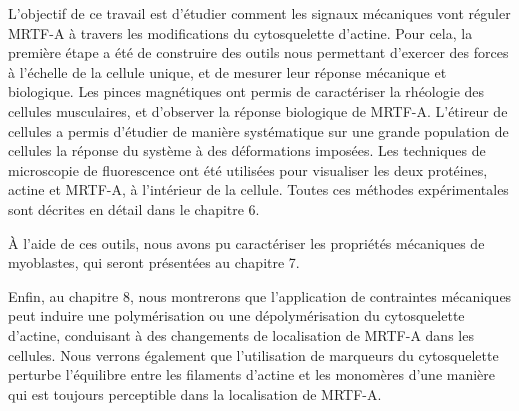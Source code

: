   L'objectif de ce travail est d'étudier comment les signaux mécaniques vont réguler MRTF-A à travers les modifications du cytosquelette d'actine. Pour cela, la première étape a été de construire des outils nous permettant d'exercer des forces à l'échelle de la cellule unique, et de mesurer leur réponse mécanique et biologique. Les pinces magnétiques ont permis de caractériser la rhéologie des cellules musculaires, et d'observer la réponse biologique de MRTF-A. L'étireur de cellules a permis d'étudier de manière systématique sur une grande population de cellules la réponse du système à des déformations imposées. Les techniques de microscopie de fluorescence ont été utilisées pour visualiser les deux protéines, actine et MRTF-A, à l'intérieur de la cellule. Toutes ces méthodes expérimentales sont décrites en détail dans le chapitre 6. 
  
  À l'aide de ces outils, nous avons pu caractériser les propriétés mécaniques de myoblastes, qui seront présentées au chapitre 7. 
  
  Enfin, au chapitre 8, nous montrerons que l'application de contraintes mécaniques peut induire une polymérisation ou une dépolymérisation du cytosquelette d'actine, conduisant à des changements de localisation de MRTF-A dans les cellules. Nous verrons également que l'utilisation de marqueurs du cytosquelette perturbe l'équilibre entre les filaments d'actine et les monomères d'une manière qui est toujours perceptible dans la localisation de MRTF-A. 





%
